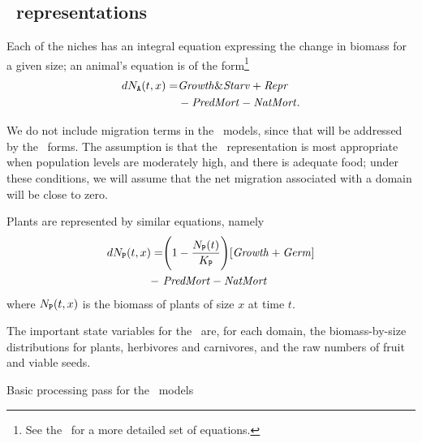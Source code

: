 \subsection*{\SD\ rep\-re\-sen\-ta\-tions}

Each of the niches has an integral equation expressing the change in
biomass for a given size; an animal's equation is of the
form\footnote{See the \SuppMaterial\ for a more detailed set of
  equations.}
\begin{align*}
  dN_{\mathtt{A}}(t,x) = & \mathit{Growth\&Starv} + \mathit{Repr} \\
  & - \mathit{PredMort} -\mathit{NatMort}.
\end{align*}

We do not include migration terms in the \SD\ models, since that will
be addressed by the \IB\ forms. The assumption is that the
\SD\ rep\-re\-sen\-ta\-tion is most appropriate when population levels are
moderately high, and there is adequate food; under these conditions,
we will assume that the net migration associated with a domain will be
close to zero.

Plants are represented by similar equations, namely
\begin{align*}
dN_{\mathtt{P}}(t,x) = &\Biggl(1 - \frac{N_{\mathtt{P}}(t)}{K_{\mathtt{P}}}\Biggr)[\mathit{Growth} + \mathit{Germ}] \\- \
& \mathit{PredMort} - \mathit{NatMort}
\end{align*}
where $N_{\mathtt{P}}(t,x)$ is the biomass of plants of size $x$ at time $t$.


The important state variables for the \SD\ are, for each domain, the
biomass-by-size distributions for plants, herbivores and carnivores, and the
raw numbers of fruit and viable seeds. 

\begin{algorithm}\label{sdalg}
  \caption{Basic processing pass for the \SD\ models}
\begin{algorithmic}
  \EndFor
\end{algorithmic}   
\end{algorithm}

